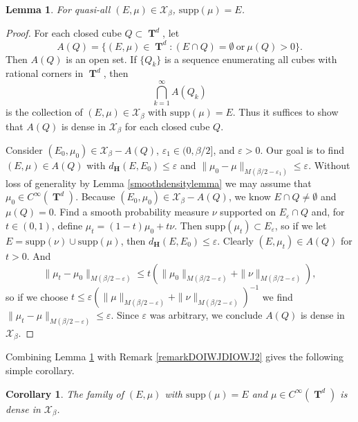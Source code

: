 \documentclass[12pt,reqno]{article}
\numberwithin{equation}{section}
\DeclareMathOperator{\TT}{\mathbf{T}}
\newtheorem{lemma}[theorem]{Lemma}
\newtheorem{corollary}[theorem]{Corollary}
\numberwithin{theorem}{section}
\begin{document}
\begin{lemma} \label{lemmaOIJAWDIOJW23232}
    For quasi-all $(E,\mu) \in \mathcal{X}_\beta$, $\text{supp}(\mu) = E$.
\end{lemma}
\begin{proof}
    For each closed cube $Q \subset \TT^d$, let
    \[ A(Q) = \{ (E,\mu) \in \TT^d: (E \cap Q) = \emptyset\ \text{or}\ \mu(Q) > 0 \}. \]
    Then $A(Q)$ is an open set. If $\{ Q_k \}$ is a sequence enumerating all cubes with rational corners in $\TT^d$, then
    \[ \bigcap_{k = 1}^\infty A(Q_k) \]
    is the collection of $(E,\mu) \in \mathcal{X}_\beta$ with $\text{supp}(\mu) = E$. Thus it suffices to show that $A(Q)$ is dense in $\mathcal{X}_\beta$ for each closed cube $Q$.

    Consider $(E_0,\mu_0) \in \mathcal{X}_\beta - A(Q)$, $\varepsilon_1 \in (0,\beta/2]$, and $\varepsilon > 0$. Our goal is to find $(E,\mu) \in A(Q)$ with $d_\mathbf{H}(E,E_0) \leq \varepsilon$ and $\| \mu_0 - \mu \|_{M(\beta/2 - \varepsilon_1)} \leq \varepsilon$. Without loss of generality by Lemma \ref{smoothdensitylemma} we may assume that $\mu_0 \in C^\infty(\TT^d)$. Because $(E_0,\mu_0) \in \mathcal{X}_\beta - A(Q)$, we know $E \cap Q \neq \emptyset$ and $\mu(Q) = 0$. Find a smooth probability measure $\nu$ supported on $E_\varepsilon \cap Q$ and, for $t \in (0,1)$, define $\mu_t = (1 - t) \mu_0 + t \nu$. Then $\text{supp}(\mu_t) \subset E_\varepsilon$, so if we let $E = \text{supp}(\nu) \cup \text{supp}(\mu)$, then $d_\mathbf{H}(E,E_0) \leq \varepsilon$. Clearly $(E,\mu_t) \in A(Q)$ for $t > 0$. And
    \[ \| \mu_t - \mu_0 \|_{M(\beta/2 - \varepsilon)} \leq t \left( \| \mu_0 \|_{M(\beta/2 - \varepsilon)} + \| \nu \|_{M(\beta/2 - \varepsilon)} \right), \]
    so if we choose $t \leq \varepsilon (\| \mu \|_{M(\beta/2 - \varepsilon)} + \| \nu \|_{M(\beta/2 - \varepsilon)})^{-1}$ we find $\| \mu_t - \mu \|_{M(\beta/2 - \varepsilon)} \leq \varepsilon$. Since $\varepsilon$ was arbitrary, we conclude $A(Q)$ is dense in $\mathcal{X}_\beta$.
\end{proof}

Combining Lemma \ref{lemmaOIJAWDIOJW23232} with Remark \ref{remarkDOIWJDIOWJ2} gives the following simple corollary.

\begin{corollary} \label{corollaryOIDJOWIJD2212}
    The family of $(E,\mu)$ with $\text{supp}(\mu) = E$ and $\mu \in C^\infty(\TT^d)$ is dense in $\mathcal{X}_\beta$.
\end{corollary}
\end{document}
